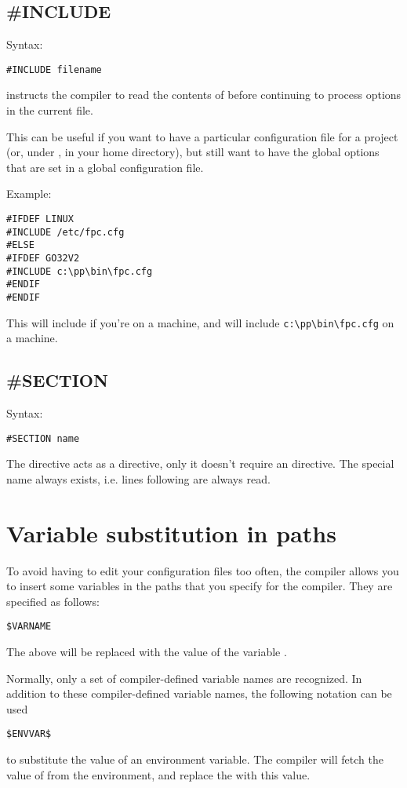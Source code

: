 \subsection{\#INCLUDE}
Syntax:
\begin{verbatim}
#INCLUDE filename
\end{verbatim}
 instructs the compiler to read the contents of
 before continuing to process options in the current file.

This can be useful if you want to have a particular configuration file
for a project (or, under \linux, in your home directory), but still want to
have the global options that are set in a global configuration file.

Example:
\begin{verbatim}
#IFDEF LINUX
#INCLUDE /etc/fpc.cfg
#ELSE
#IFDEF GO32V2
#INCLUDE c:\pp\bin\fpc.cfg
#ENDIF
#ENDIF
\end{verbatim}
This will include  if you're on a \linux machine,
and will include \verb+c:\pp\bin\fpc.cfg+
on a \dos machine.

\subsection{\#SECTION}
Syntax:
\begin{verbatim}
#SECTION name
\end{verbatim}
The  directive acts as a  directive, only
it doesn't require an  directive. The special name 
always exists, i.e. lines following  are always read.

\section{Variable substitution in paths}
To avoid having to edit your configuration files too often, the compiler allows
you to insert some variables in the paths that you specify for the compiler.
They are specified as follows:
\begin{verbatim}
$VARNAME
\end{verbatim}
The above will be replaced with the value of the variable .

Normally, only a set of compiler-defined variable names are recognized.
In addition to these compiler-defined variable names, the following
notation can be used
\begin{verbatim}
$ENVVAR$
\end{verbatim}
to substitute the value of an environment variable. The compiler will fetch
the value of  from the environment, and replace the
 with this value.

